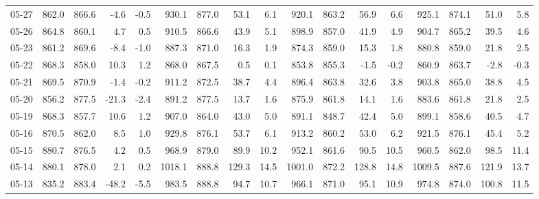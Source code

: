 \begin{threeparttable}
{\begin{tabular}{lrrrrrrrrrrrrrrrr}
  05-27 & 862.0 & 866.6 &       -4.6 &           -0.5 &  930.1 & 877.0 &       53.1 &            6.1 &  920.1 & 863.2 &       56.9 &            6.6 &  925.1 &  874.1 &        51.0 &              5.8 \\
  05-26 & 864.8 & 860.1 &        4.7 &            0.5 &  910.5 & 866.6 &       43.9 &            5.1 &  898.9 & 857.0 &       41.9 &            4.9 &  904.7 &  865.2 &        39.5 &              4.6 \\
  05-23 & 861.2 & 869.6 &       -8.4 &           -1.0 &  887.3 & 871.0 &       16.3 &            1.9 &  874.3 & 859.0 &       15.3 &            1.8 &  880.8 &  859.0 &        21.8 &              2.5 \\
  05-22 & 868.3 & 858.0 &       10.3 &            1.2 &  868.0 & 867.5 &        0.5 &            0.1 &  853.8 & 855.3 &       -1.5 &           -0.2 &  860.9 &  863.7 &        -2.8 &             -0.3 \\
  05-21 & 869.5 & 870.9 &       -1.4 &           -0.2 &  911.2 & 872.5 &       38.7 &            4.4 &  896.4 & 863.8 &       32.6 &            3.8 &  903.8 &  865.0 &        38.8 &              4.5 \\
  05-20 & 856.2 & 877.5 &      -21.3 &           -2.4 &  891.2 & 877.5 &       13.7 &            1.6 &  875.9 & 861.8 &       14.1 &            1.6 &  883.6 &  861.8 &        21.8 &              2.5 \\
  05-19 & 868.3 & 857.7 &       10.6 &            1.2 &  907.0 & 864.0 &       43.0 &            5.0 &  891.1 & 848.7 &       42.4 &            5.0 &  899.1 &  858.6 &        40.5 &              4.7 \\
  05-16 & 870.5 & 862.0 &        8.5 &            1.0 &  929.8 & 876.1 &       53.7 &            6.1 &  913.2 & 860.2 &       53.0 &            6.2 &  921.5 &  876.1 &        45.4 &              5.2 \\
  05-15 & 880.7 & 876.5 &        4.2 &            0.5 &  968.9 & 879.0 &       89.9 &           10.2 &  952.1 & 861.6 &       90.5 &           10.5 &  960.5 &  862.0 &        98.5 &             11.4 \\
  05-14 & 880.1 & 878.0 &        2.1 &            0.2 & 1018.1 & 888.8 &      129.3 &           14.5 & 1001.0 & 872.2 &      128.8 &           14.8 & 1009.5 &  887.6 &       121.9 &             13.7 \\
  05-13 & 835.2 & 883.4 &      -48.2 &           -5.5 &  983.5 & 888.8 &       94.7 &           10.7 &  966.1 & 871.0 &       95.1 &           10.9 &  974.8 &  874.0 &       100.8 &             11.5 \\

\end{tabular}}
\end{threeparttable}

